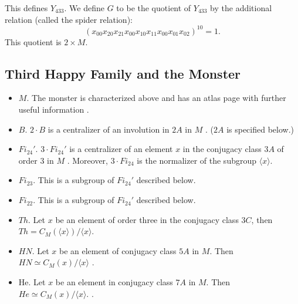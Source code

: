 This defines $Y_{433}$.  We define $G$ to be the quotient of $Y_{433}$ by
the additional relation (called the spider relation):
\[
(x_{00}x_{20}x_{21} x_{00}x_{10}x_{11} x_{00} x_{01} x_{02})^{10} = 1.
\]
This quotient is $2 \times M$.



\subsection{Third Happy Family and the Monster}

 
\begin{itemize}
\item $M$.  The monster is characterized above and has an atlas page
  with further useful information \cite{AM}.
\item $B$.  $2\cdot B$ is a centralizer of an involution in $2A$ in $M$
  \cite[p.256]{wilson2009finite}.  ($2A$ is specified below.)
\item $Fi_{24}'$.  $3\cdot Fi_{24}'$ is a centralizer of an element $x$ in
  the conjugacy class $3A$ of order $3$ in $M$ \cite[p.256-257]{wilson2009finite}.
  Moreover, $3\cdot Fi_{24}$ is the normalizer of the subgroup $\langle x\rangle $.
\item $Fi_{23}$.  This is a subgroup of $Fi_{24}'$ described below.
\item $Fi_{22}$.  This is a subgroup of $Fi_{24}'$ described below.
\item $Th$.  Let $x$ be an element of order three in the conjugacy
  class $3C$, then $Th = C_M(\langle x\rangle )/\langle x\rangle $.
\item $HN$.  Let $x$ be an element of conjugacy class $5A$ in $M$.
  Then $HN \simeq C_M(x)/\langle x\rangle $ \cite[p.262]{wilson2009finite}.
\item He.  Let $x$ be an element in conjugacy class $7A$ in $M$.  Then
  $He \simeq C_M(x)/\langle x\rangle.$ \cite[p.263]{wilson2009finite}.  %
\end{itemize}

